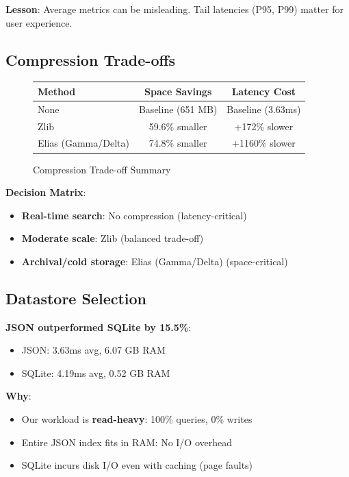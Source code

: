 \documentclass[12pt,a4paper]{article}
\begin{document}
\textbf{Lesson}: Average metrics can be misleading. Tail latencies (P95, P99) matter for user experience.

\subsection{Compression Trade-offs}

\begin{figure}[H]
\centering
\begin{tabular}{lcc}
\toprule
\textbf{Method} & \textbf{Space Savings} & \textbf{Latency Cost} \\
\midrule
None & Baseline (651 MB) & Baseline (3.63ms) \\
Zlib & 59.6\% smaller & +172\% slower \\
Elias (Gamma/Delta) & 74.8\% smaller & +1160\% slower \\
\bottomrule
\end{tabular}
\caption{Compression Trade-off Summary}
\end{figure}

\textbf{Decision Matrix}:
\begin{itemize}
    \item \textbf{Real-time search}: No compression (latency-critical)
    \item \textbf{Moderate scale}: Zlib (balanced trade-off)
    \item \textbf{Archival/cold storage}: Elias (Gamma/Delta) (space-critical)
\end{itemize}

\subsection{Datastore Selection}

\textbf{JSON outperformed SQLite by 15.5\%}:
\begin{itemize}
    \item JSON: 3.63ms avg, 6.07 GB RAM
    \item SQLite: 4.19ms avg, 0.52 GB RAM
\end{itemize}

\textbf{Why}:
\begin{itemize}
    \item Our workload is \textbf{read-heavy}: 100\% queries, 0\% writes
    \item Entire JSON index fits in RAM: No I/O overhead
    \item SQLite incurs disk I/O even with caching (page faults)
\end{itemize}
\end{document}
